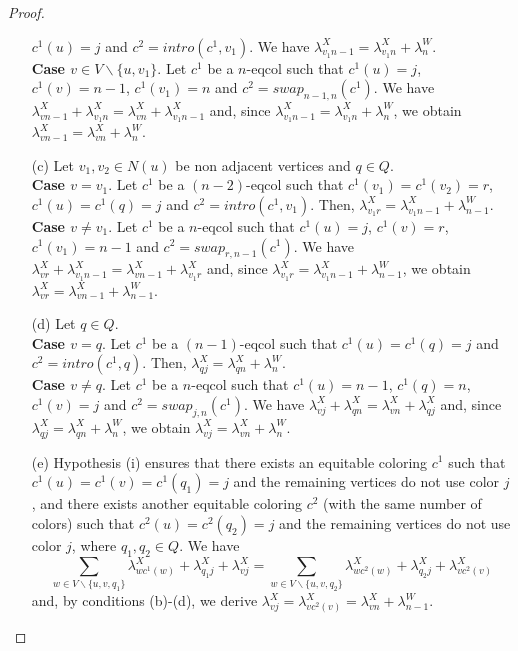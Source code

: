 \begin{proof}
\begin{enumerate}
$c^1(u) = j$ and $c^2 = intro(c^1,v_1)$. We have $\lambda^X_{v_1 n-1} = \lambda^X_{v_1 n} + \lambda^W_n$.\\
\textbf{Case $v \in V \backslash \{u, v_1\}$}. Let $c^1$ be a $n$-eqcol such that $c^1(u) = j$, $c^1(v) = n-1$, $c^1(v_1) = n$ and $c^2 = swap_{n-1,n}(c^1)$.
We have $\lambda^X_{vn-1} + \lambda^X_{v_1 n} = \lambda^X_{vn} + \lambda^X_{v_1 n-1}$ and, since
$\lambda^X_{v_1 n-1} = \lambda^X_{v_1 n} + \lambda^W_n$, we obtain $\lambda^X_{v n-1} = \lambda^X_{v n} + \lambda^W_n$.
\item[(c)] Let $v_1, v_2 \in N(u)$ be non adjacent vertices and $q \in Q$.\\
\textbf{Case $v = v_1$}. Let $c^1$ be a $(n-2)$-eqcol such that $c^1(v_1) = c^1(v_2) = r$,
$c^1(u) = c^1(q) = j$ and $c^2 = intro(c^1,v_1)$. Then, $\lambda^X_{v_1 r} = \lambda^X_{v_1 n-1} + \lambda^W_{n-1}$.\\
\textbf{Case $v \neq v_1$}. Let $c^1$ be a $n$-eqcol such that $c^1(u) = j$, $c^1(v) = r$, $c^1(v_1) = n-1$ and
$c^2 = swap_{r,n-1}(c^1)$. We have $\lambda^X_{vr} + \lambda^X_{v_1 n-1} = \lambda^X_{vn-1} + \lambda^X_{v_1 r}$ and,
since $\lambda^X_{v_1 r} = \lambda^X_{v_1 n-1} + \lambda^W_{n-1}$, we obtain
$\lambda^X_{vr} = \lambda^X_{vn-1} + \lambda^W_{n-1}$.
\item[(d)] Let $q \in Q$.\\
\textbf{Case $v = q$}. Let $c^1$ be a $(n-1)$-eqcol such that $c^1(u) = c^1(q) = j$ and
$c^2 = intro(c^1,q)$. Then, $\lambda^X_{qj} = \lambda^X_{qn} + \lambda^W_n$.\\
\textbf{Case $v \neq q$}. Let $c^1$ be a $n$-eqcol such that $c^1(u) = n-1$, $c^1(q) = n$, $c^1(v) = j$ and $c^2 = swap_{j,n}(c^1)$.
We have $\lambda^X_{vj} + \lambda^X_{qn} = \lambda^X_{vn} + \lambda^X_{qj}$ and, since $\lambda^X_{qj} = \lambda^X_{qn} + \lambda^W_n$, we obtain $\lambda^X_{vj} = \lambda^X_{vn} + \lambda^W_n$.
\item[(e)] Hypothesis (i) ensures that there exists an equitable coloring $c^1$ such that
$c^1(u) = c^1(v) = c^1(q_1) = j$ and the remaining vertices do not use color $j$, and there exists
another equitable coloring $c^2$ (with the same number of colors) such that $c^2(u) = c^2(q_2) = j$
and the remaining vertices do not use color $j$, where $q_1, q_2 \in Q$. We have
\[ \sum_{w \in V\backslash\{u,v,q_1\}} \lambda^X_{w c^1(w)} + \lambda^X_{q_1 j} + \lambda^X_{vj}
= \sum_{w \in V\backslash\{u,v,q_2\}} \lambda^X_{w c^2(w)} + \lambda^X_{q_2 j} + \lambda^X_{vc^2(v)} \]
and, by conditions (b)-(d), we derive
$\lambda^X_{vj} = \lambda^X_{vc^2(v)} = \lambda^X_{vn} + \lambda^W_{n-1}$.

\end{enumerate}
\end{proof}
